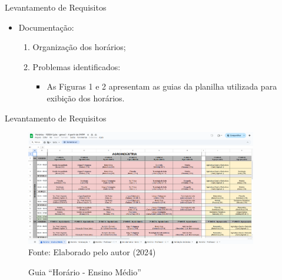 \begin{frame}{Levantamento de Requisitos}
    \begin{itemize}
        \item Documentação: \vspace{0.5cm}
              \begin{enumerate}
                  \item Organização dos horários; \vspace{0.5cm}
                  \item Problemas identificados: \vspace{0.5cm}
                        \begin{itemize}
                            \item As Figuras 1 e 2 apresentam as guias da planilha utilizada para exibição dos horários.
                        \end{itemize}
              \end{enumerate}
    \end{itemize}
\end{frame}

\begin{frame}{Levantamento de Requisitos}
    \begin{figure}
        \centering
        \vspace{-0.5cm}
        \caption{Guia ``Horário - Ensino Médio''}
        \vspace{-0.2cm}
        \includegraphics[width=0.9\textwidth]{figuras/plan-ant-1.png}
        \\ %
        \small Fonte: Elaborado pelo autor (2024)
    \end{figure}
\end{frame}

